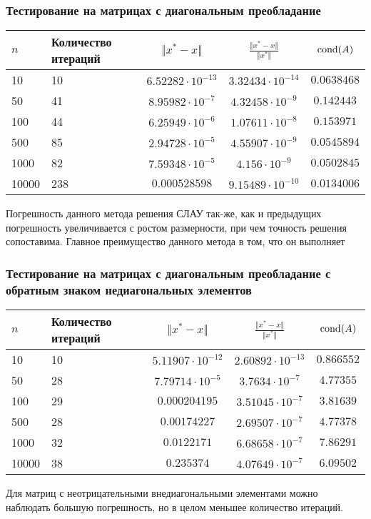 \documentclass[english]{article}
\begin{document}
\subsubsection{Тестирование на матрицах с диагональным преобладание}
\begin{center}
  \begin{longtable}{l|l|c|c|c}
    \(n\) & Количество итераций & \(\Vert x^* - x \Vert\) & \(\frac{\Vert x^* - x \Vert}{\Vert x^* \Vert}\) & \(\mathop{\rm cond}(A) \)\\
    \hline
    10 & 10 & \(6.52282\cdot 10^{-13}\) & \(3.32434\cdot 10^{-14}\) & \(0.0638468\) \\
    50 & 41 & \(8.95982\cdot 10^{-7}\) & \(4.32458\cdot 10^{-9}\) & \(0.142443\) \\
    100 & 44 & \(6.25949\cdot 10^{-6}\) & \(1.07611\cdot 10^{-8}\) & \(0.153971\) \\
    500 & 85 & \(2.94728\cdot 10^{-5}\) & \(4.55907\cdot 10^{-9}\) & \(0.0545894\) \\
    1000 & 82 & \(7.59348\cdot 10^{-5}\) & \(4.156\cdot 10^{-9}\) & \(0.0502845\) \\
    10000 & 238 & \(0.000528598\) & \(9.15489\cdot 10^{-10}\) & \(0.0134006\)
  \end{longtable}
\end{center}
Погрешность данного метода решения СЛАУ так-же, как и предыдущих
погрешность увеличивается с ростом размерности, при чем точность
решения сопоставима. Главное преимущество данного метода в том, что он
выполняет
\subsubsection{Тестирование на матрицах с диагональным преобладание с обратным знаком недиагональных элементов}
\begin{center}
  \begin{longtable}{l|l|c|c|c}
    \(n\) & Количество итераций & \(\Vert x^* - x \Vert\) & \(\frac{\Vert x^* - x \Vert}{\Vert x^* \Vert}\) & \(\mathop{\rm cond}(A) \)\\
    \hline
    10 & 10 & \(5.11907\cdot 10^{-12}\) & \(2.60892\cdot 10^{-13}\) & \(0.866552\) \\
    50 & 28 & \(7.79714\cdot 10^{-5}\) & \(3.7634\cdot 10^{-7}\) & \(4.77355\) \\
    100 & 29 & \(0.000204195\) & \(3.51045\cdot 10^{-7}\) & \(3.81639\) \\
    500 & 28 & \(0.00174227\) & \(2.69507\cdot 10^{-7}\) & \(4.77378\) \\
    1000 & 32 & \(0.0122171\) & \(6.68658\cdot 10^{-7}\) & \(7.86291\) \\
    10000 & 38 & \(0.235374\) & \(4.07649\cdot 10^{-7}\) & \(6.09502\)
  \end{longtable}
\end{center}
Для матриц с неотрицательными внедиагональными элементами можно наблюдать большую погрешность, но в целом меньшее количество итераций.
\end{document}
